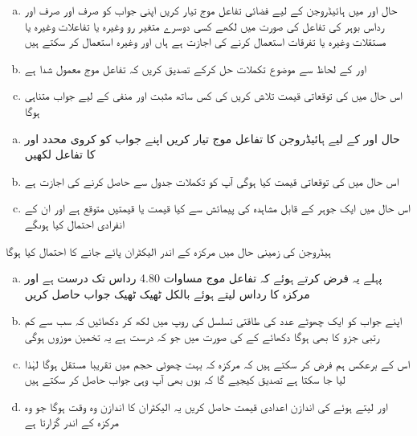 \begin{enumerate}[a.]
\item
حال   اور  میں ہائیڈروجن کے لیے فضائی تفاعل موج  تیار کریں اپنی جواب کو صرف اور صرف    اور  رداس بوہر کی تفاعل کی صورت میں لکھے کسی دوسرے متغیر رو  وغیرہ یا تفاعلات   وغیرہ یا مستقلات   وغیرہ یا تفرقات استعمال کرنے کی اجازت ہے ہاں   اور  وغیرہ استعمال کر سکتے ہیں 
\item
{}  اور  کے لحاظ سے موضوع تکملات حل کرکے تصدیق کریں کہ تفاعل موج معمول شدا ہے 
\item
اس حال میں  کی توقعاتی قیمت تلاش کریں  کی کس ساتھ مثبت اور منفی کے لیے جواب متناہی ہوگا 
\end{enumerate}
\begin{enumerate}[a.]
\item
حال   اور  کے لیے ہائیڈروجن کا تفاعل موج تیار کریں اپنے جواب کو کروی محدد   اور  کا تفاعل لکھیں 
\item
 اس حال میں  کی توقعاتی قیمت کیا ہوگی آپ کو تکملات جدول سے حاصل کرنے کی اجازت ہے 
\item
اس حال میں ایک جوہر کے قابل مشاہدہ   کی پیمائش سے کیا قیمت یا قیمتیں متوقع ہے اور ان کے انفرادی احتمال کیا ہوںگے 
\end{enumerate}
ہیڈروجن کی زمینی حال میں مرکزہ کے اندر الیکٹران پائے جانے کا احتمال کیا ہوگا 
\begin{enumerate}[a.]
\item
پہلے یہ فرض کرتے ہوئے کہ تفاعل موج مساوات 4.80 رداس  تک درست ہے اور مرکزہ کا رداس  لیتے ہوئے بالکل ٹھیک ٹھیک جواب حاصل کریں 
\item
اپنے جواب کو ایک چھوٹے عدد  کی طاقتی تسلسل کی روپ میں لکھ کر دکھائیں کہ سب سے کم رتبی  جزو کا بھی ہوگا  دکھائے کے  کی صورت میں جو کہ درست ہے یہ تخمین موزوں ہوگی 
 \item
اس کے برعکس ہم فرض کر سکتے ہیں کہ مرکزہ کہ بہت چھوٹی حجم میں  تقریبا مستقل ہوگا لہٰذا  لیا جا سکتا ہے تصدیق کیجیے گا کہ یوں بھی آپ وہی جواب حاصل کر سکتے ہیں 
\item
{} اور  لیتے ہوئے  کی اندازن اعدادی قیمت حاصل کریں یہ الیکٹران کا اندازن وہ وقت ہوگا جو وہ مرکزہ کے اندر گزارتا ہے 
\end{enumerate}
